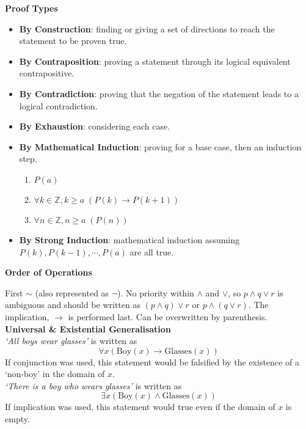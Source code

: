 \documentclass[a4paper]{article}
\newcommand{\subheading}[1]{{\scriptsize\textbf{#1}}}
\begin{document}
\begin{multicols*}{4}
\subheading{Proof Types}
\begin{itemize}[leftmargin=*] \itemsep -0.5em
  \item \textbf{By Construction}: finding or giving a set of directions to
    reach the statement to be proven true.
  \item \textbf{By Contraposition}: proving a statement through its logical
    equivalent contrapositive.
  \item \textbf{By Contradiction}: proving that the negation of the statement
    leads to a logical contradiction.
  \item \textbf{By Exhaustion}: considering each case.
  \item \textbf{By Mathematical Induction}: proving for a base case, then an
    induction step.
    \vspace{-1em} %
    \begin{enumerate} \itemsep -0.2em
      \item $P(a)$
      \item $\forall k \in \mathbb{Z}, k \geq a\;(P(k) \rightarrow P(k+1))$
      \item $\forall n \in \mathbb{Z}, n \geq a\;(P(n))$
    \end{enumerate}
  \vspace{-0.5em}
  \item \textbf{By Strong Induction}: mathematical induction assuming $P(k),
    P(k-1), \cdots, P(a)$ are all true.
\end{itemize}

\subheading{Order of Operations}

First $\sim$ (also represented as $\neg$). No priority within $\land$ and
$\lor$, so $p \land q \lor r$ is ambiguous and should be written as
$(p \land q) \lor r$ or $p \land (q \lor r)$. The implication, $\rightarrow$ is
performed last. Can be overwritten by parenthesis.\\

\subheading{Universal \& Existential Generalisation}\\
\textit{`All boys wear glasses'} is written as
  $$\forall x (\text{Boy}(x) \rightarrow \text{Glasses}(x)) $$
If conjunction was used, this statement would be falsified by the existence of a
`non-boy' in the domain of $x$.\\

\textit{`There is a boy who wears glasses'} is written as
  $$\exists x (\text{Boy}(x) \land \text{Glasses}(x)) $$
If implication was used, this statement would true even if the domain of $x$ is
empty.\\


\end{multicols*}
\end{document}
